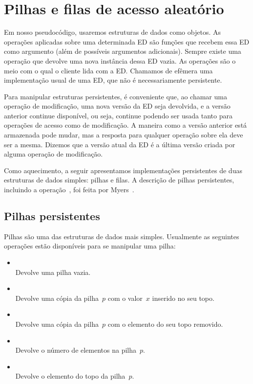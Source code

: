 \documentclass[main.tex]{subfiles}
\begin{document}
\chapter{Pilhas e filas de acesso aleatório} \label{cap:pilha_persist}

Em nosso pseudocódigo, usaremos estruturas de dados como objetos. As operações aplicadas sobre uma determinada ED são funções que recebem essa ED como argumento (além de possíveis argumentos adicionais). Sempre existe uma operação que devolve uma nova instância dessa ED vazia. As operações são o meio com o qual o cliente lida com a ED.
Chamamos de efêmera uma implementação usual de uma ED, que não é necessariamente persistente.

Para manipular estruturas persistentes, é conveniente que, ao chamar uma operação de modificação, uma nova versão da ED seja devolvida, e a versão anterior continue disponível, ou seja, continue podendo ser usada tanto para operações de acesso como de modificação. A maneira como a versão anterior está armazenada pode mudar, mas a resposta para qualquer operação sobre ela deve ser a mesma. Dizemos que a versão atual da ED é a última versão criada por alguma operação de modificação.

Como aquecimento, a seguir apresentamos implementações persistentes de duas estruturas de dados simples: pilhas e filas. A descrição de pilhas persistentes, incluindo a operação~, foi feita por Myers~\cite{Myers83}.

\section{Pilhas persistentes}

Pilhas são uma das estruturas de dados mais simples. Usualmente as seguintes operações estão disponíveis para se manipular uma pilha:

\begin{itemize}
	\item {}
		\\ Devolve uma pilha vazia.
	\item {}
		\\ Devolve uma cópia da pilha~$p$ com o valor~$x$ inserido no seu topo.
	\item {}
		\\ Devolve uma cópia da pilha~$p$ com o elemento do seu topo removido.
	\item {}
		\\ Devolve o número de elementos na pilha~$p$.
	\item {}
		\\ Devolve o elemento do topo da pilha~$p$.
\end{itemize}
\end{document}
